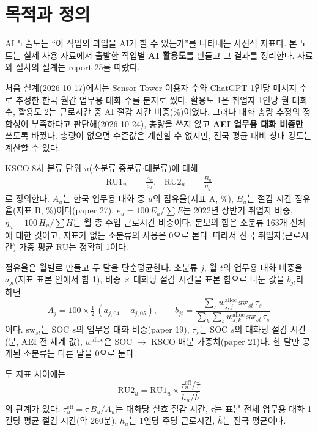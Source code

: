 \documentclass[11pt]{article}
\begin{document}
\tableofcontents

\section{목적과 정의}

AI 노출도는 ``이 직업의 과업을 AI가 할 수 있는가''를 나타내는 사전적 지표다. 본 노트는 실제 사용 자료에서 출발한 직업별 \textbf{AI 활용도}를 만들고 그 결과를 정리한다. 자료와 절차의 설계는 report 25를 따랐다.

처음 설계(2026-10-17)에서는 Sensor Tower 이용자 수와 ChatGPT 1인당 메시지 수로 추정한 한국 월간 업무용 대화 수를 분자로 썼다. 활용도 1은 취업자 1인당 월 대화 수, 활용도 2는 근로시간 중 AI 절감 시간 비중(\%)이었다. 그러나 대화 총량 추정의 정합성이 부족하다고 판단해(2026-10-24), 총량을 쓰지 않고 \textbf{AEI 업무용 대화 비중만} 쓰도록 바꿨다. 총량이 없으면 수준값은 계산할 수 없지만, 전국 평균 대비 상대 강도는 계산할 수 있다.

KSCO 8차 분류 단위 $u$(소분류$\cdot$중분류$\cdot$대분류)에 대해
\begin{align}
\mathrm{RU1}_u &= \frac{A_u}{e_u}, &
\mathrm{RU2}_u &= \frac{B_u}{\eta_u}
\end{align}
로 정의한다. $A_u$는 한국 업무용 대화 중 $u$의 점유율(지표 A, \%), $B_u$는 절감 시간 점유율(지표 B, \%)이다(paper 27). $e_u = 100\,E_u/\sum E$는 2022년 상반기 취업자 비중, $\eta_u = 100\,H_u/\sum H$는 월 총 주업 근로시간 비중이다. 분모의 합은 소분류 163개 전체에 대한 것이고, 지표가 없는 소분류의 사용은 0으로 본다. 따라서 전국 취업자(근로시간) 가중 평균 RU는 정확히 1이다.

점유율은 월별로 만들고 두 달을 단순평균한다. 소분류 $j$, 월 $t$의 업무용 대화 비중을 $a_{jt}$(지표 표본 안에서 합 1), 비중 $\times$ 대화당 절감 시간을 표본 합으로 나눈 값을 $b_{jt}$라 하면
\[
A_j = 100\times\tfrac12\,(a_{j,04} + a_{j,05}),\qquad
b_{jt} = \frac{\sum_s w^{\text{alloc}}_{s,j}\, \mathrm{sw}_{st}\, \tau_s}{\sum_k \sum_s w^{\text{alloc}}_{s,k}\, \mathrm{sw}_{st}\, \tau_s}
\]
이다. $\mathrm{sw}_{st}$는 SOC $s$의 업무용 대화 비중(paper 19), $\tau_s$는 SOC $s$의 대화당 절감 시간(분, AEI 전 세계 값), $w^{\text{alloc}}$은 SOC $\to$ KSCO 배분 가중치(paper 21)다. 한 달만 공개된 소분류는 다른 달을 0으로 둔다.

두 지표 사이에는
\[
\mathrm{RU2}_u = \mathrm{RU1}_u \times \frac{\tau^{\text{eff}}_u / \bar\tau}{h_u / \bar h}
\]
의 관계가 있다. $\tau^{\text{eff}}_u = \bar\tau\, B_u / A_u$는 대화당 실효 절감 시간, $\bar\tau$는 표본 전체 업무용 대화 1건당 평균 절감 시간(약 260분), $h_u$는 1인당 주당 근로시간, $\bar h$는 전국 평균이다.
\end{document}
